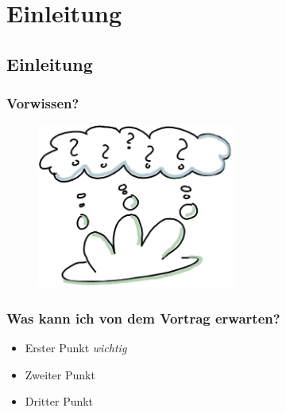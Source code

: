 \section{Einleitung}

\subsection*{Einleitung}

\begin{frame}
	\frametitle{Vorwissen?}
		\begin{figure}[ht]
			\includegraphics[width=6.5cm]{Bilder/fragerunde.png}
		\end{figure}
\end{frame}

\begin{frame}
	\frametitle{Was kann ich von dem Vortrag erwarten?}
	\begin{itemize}[<+->]
		\item Erster Punkt \emph{wichtig}
		\item Zweiter Punkt
		\item Dritter Punkt
	\end{itemize}
\end{frame}
